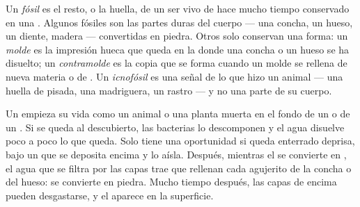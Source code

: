 \begin{definition}[Fósil]\label{def:g7:sediments-and-fossils:fossil}
Un \emph{fósil} es el resto, o la huella, de un ser vivo
de hace mucho tiempo conservado en una . Algunos fósiles son las partes
duras del cuerpo --- una concha, un hueso, un diente, madera ---
convertidas en piedra. Otros solo conservan una forma: un
\emph{molde} es la impresión hueca que queda en la 
donde una concha o un hueso se ha disuelto; un
\emph{contramolde} es la copia que se forma cuando un
molde se rellena de nueva materia  o de . Un
\emph{icnofósil} es una señal de lo que hizo un
animal --- una huella de pisada, una madriguera, un rastro --- y no una
parte de su cuerpo.
\end{definition}

Un  empieza su vida como un animal o una planta muerta en el fondo de
un  o de un . Si se queda al descubierto, las bacterias lo
descomponen y el agua disuelve poco a poco lo que queda. Solo tiene una
oportunidad si queda enterrado deprisa, bajo un  que se deposita
encima y lo aísla. Después, mientras el  se convierte en , el
agua que se filtra por las capas trae  que rellenan cada
agujerito de la concha o del hueso: se convierte en piedra. Mucho tiempo
después, las capas de encima pueden desgastarse, y el  aparece en la
superficie.

